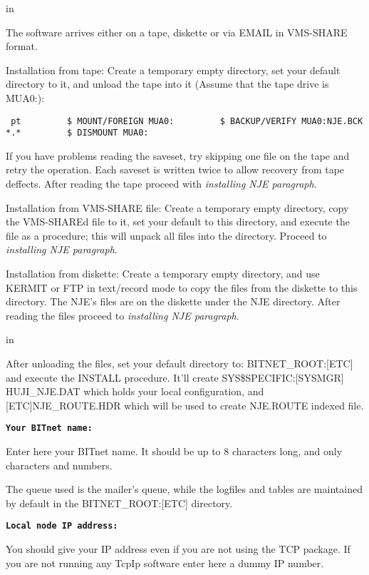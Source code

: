  in

The software arrives either on a  tape,  diskette  or  via  EMAIL  in
VMS-SHARE format.

{\ncrBold Installation  from  tape}:  Create  a temporary empty directory,
set your
default directory to it, and unload the tape into it  (Assume  that  the
tape drive is MUA0:):

{\obeyspaces\obeylines\tt{} pt
~~~~~~~~\$ MOUNT/FOREIGN  MUA0:
~~~~~~~~\$ BACKUP/VERIFY  MUA0:NJE.BCK  *.*
~~~~~~~~\$ DISMOUNT  MUA0:
}

If  you  have problems reading the saveset, try skipping one file on the
tape and retry the operation. Each saveset is  written  twice  to  allow
recovery from tape deffects.
\hfill\break
After reading the tape proceed with {\sl installing NJE paragraph}.

{\ncrBold Installation  from  VMS-SHARE  file}: Create a temporary empty
directory,
copy the VMS-SHAREd file to it, set your default to this directory,  and
execute  the  file  as  a procedure; this will unpack all files into the
directory.
\hfill\break
Proceed to {\sl installing NJE paragraph}.

{\ncrBold Installation from diskette}: Create a temporary empty directory,
and  use
KERMIT or FTP in text/record mode to copy the files from the diskette to
this directory. The NJE's files  are  on  the  diskette  under  the  NJE
directory.
\hfill\break
After reading the files proceed to {\sl installing NJE paragraph}.

 in

After unloading the files, set your default directory to:
BITNET\_ROOT:[ETC]
and  execute  the  INSTALL procedure. It'll create SYS\$SPECIFIC:[SYSMGR]
HUJI\_NJE.DAT    which    holds    your    local    configuration,    and
[ETC]NJE\_ROUTE.HDR which will be used to create NJE.ROUTE indexed file.

{\tt \bf Your BITnet name:}

Enter  here  your BITnet name. It should be up to 8 characters long, and
only characters and numbers.

The queue used is the mailer's queue, while the logfiles and tables  are
maintained by default in the BITNET\_ROOT:[ETC] directory.

{\tt \bf Local node IP address:}

You  should  give  your  IP  address  even  if you are not using the TCP
package. If you are not running any TcpIp software enter here a dummy IP
number.

